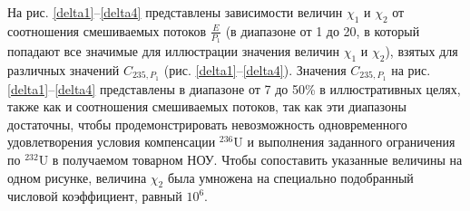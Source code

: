 На рис. \ref{delta1}--\ref{delta4} представлены зависимости величин $\chi_1$ и $\chi_2$ от соотношения смешиваемых потоков $\frac{E}{P_1}$ (в диапазоне от 1 до 20, в который попадают все значимые для иллюстрации значения величин $\chi_1$ и $\chi_2$), взятых для различных значений $C_{235, P_1}$ (рис. \ref{delta1}--\ref{delta4}). Значения $C_{235, P_1}$ на рис. \ref{delta1}--\ref{delta4} представлены в диапазоне от 7 до 50\% в иллюстративных целях,  также как и соотношения смешиваемых потоков, так как эти диапазоны достаточны, чтобы продемонстрировать невозможность одновременного удовлетворения условия компенсации $^{236}$U и выполнения заданного ограничения по $^{232}$U в получаемом товарном НОУ. Чтобы сопоставить указанные величины на одном рисунке, величина $\chi_2$ была умножена на специально подобранный числовой коэффициент, равный $10^{6}$.


